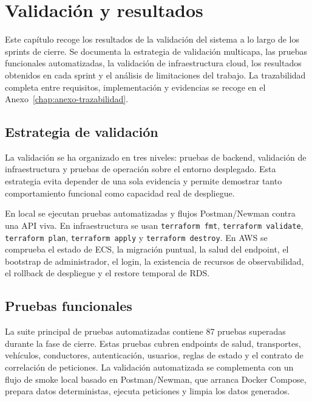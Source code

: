\chapter{Validación y resultados}
\label{chap:validacion-resultados}

Este capítulo recoge los resultados de la validación del sistema a lo largo de los sprints de cierre. Se documenta la estrategia de validación multicapa, las pruebas funcionales automatizadas, la validación de infraestructura cloud, los resultados obtenidos en cada sprint y el análisis de limitaciones del trabajo. La trazabilidad completa entre requisitos, implementación y evidencias se recoge en el Anexo~\ref{chap:anexo-trazabilidad}.

\section{Estrategia de validación}
\label{sec:estrategia-validacion}

La validación se ha organizado en tres niveles: pruebas de backend, validación de infraestructura y pruebas de operación sobre el entorno desplegado. Esta estrategia evita depender de una sola evidencia y permite demostrar tanto comportamiento funcional como capacidad real de despliegue.

En local se ejecutan pruebas automatizadas y flujos Postman/Newman contra una API viva. En infraestructura se usan \texttt{terraform fmt}, \texttt{terraform validate}, \texttt{terraform plan}, \texttt{terraform apply} y \texttt{terraform destroy}. En AWS se comprueba el estado de ECS, la migración puntual, la salud del endpoint, el bootstrap de administrador, el login, la existencia de recursos de observabilidad, el rollback de despliegue y el restore temporal de RDS.

\section{Pruebas funcionales}
\label{sec:pruebas-funcionales}

La suite principal de pruebas automatizadas contiene 87 pruebas superadas durante la fase de cierre. Estas pruebas cubren endpoints de salud, transportes, vehículos, conductores, autenticación, usuarios, reglas de estado y el contrato de correlación de peticiones. La validación automatizada se complementa con un flujo de smoke local basado en Postman/Newman, que arranca Docker Compose, prepara datos deterministas, ejecuta peticiones y limpia los datos generados.

